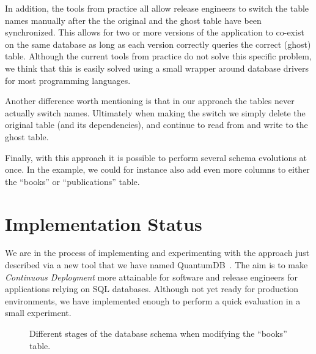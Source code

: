 \documentclass[conference]{IEEEtran}
\begin{document}
In addition, the tools from practice all allow release engineers to switch the table names manually after the the original and the ghost table have been synchronized. This allows for two or more versions of the application to co-exist on the same database as long as each version correctly queries the correct (ghost) table. Although the current tools from practice do not solve this specific problem, we think that this is easily solved using a small wrapper around database drivers for most programming languages.

Another difference worth mentioning is that in our approach the tables never actually switch names. Ultimately when making the switch we simply delete the original table (and its dependencies), and continue to read from and write to the ghost table.

Finally, with this approach it is possible to perform several schema evolutions at once. In the example, we could for instance also add even more columns to either the ``books'' or ``publications'' table.

\section{Implementation Status} %

We are in the process of implementing and experimenting with the approach just described via a new tool that we have named QuantumDB~\cite{QuantumDB}.
The aim is to make \textit{Continuous Deployment} more attainable for software and release engineers for applications relying on SQL databases. Although not yet ready for production environments, we have implemented enough to perform a quick evaluation in a small experiment. 

\begin{figure}%
    \centering
    \qquad
    \qquad
    \caption{Different stages of the database schema when modifying the ``books'' table.}%
    \label{fig:migration-stages}%
\end{figure}
\end{document}
